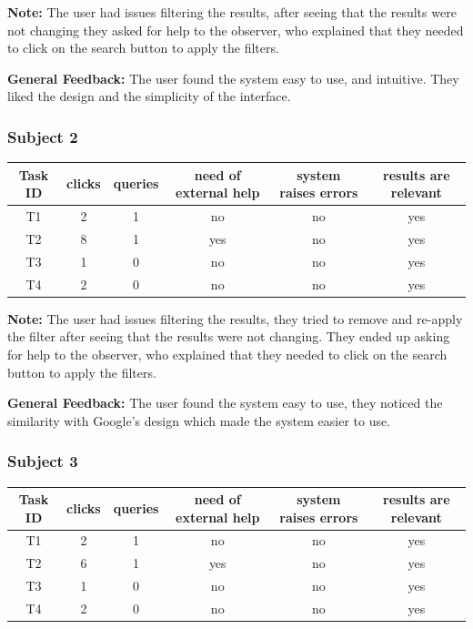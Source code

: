 \documentclass[unicode,9pt,a4paper,oneside,numbers=endperiod,openany]{scrartcl}
\begin{document}
\vspace{0.2cm}

\textbf{Note:} The user had issues filtering the results, after seeing that the results were not changing they asked for help to the observer,
who explained that they needed to click on the search button to apply the filters.

\textbf{General Feedback:} The user found the system easy to use, and intuitive. They liked the design and the simplicity of the interface.

\subsubsection{Subject 2}

\begin{tabular}{c|c|c|c|c|c}
    Task ID & clicks & queries & need of external help & system raises errors & results are relevant \\ \hline
    T1      & 2      & 1       & no                    & no                   & yes                  \\
    T2      & 8      & 1       & yes                   & no                   & yes                  \\
    T3      & 1      & 0       & no                    & no                   & yes                  \\
    T4      & 2      & 0       & no                    & no                   & yes                  \\
\end{tabular}

\vspace{0.2cm}
\textbf{Note:} The user had issues filtering the results, they tried to remove and re-apply the filter after seeing that the results were not changing.
They ended up asking for help to the observer, who explained that they needed to click on the search button to apply the filters.

\textbf{General Feedback:} The user found the system easy to use, they noticed the similarity with Google's design which made the system easier to use.

\subsubsection{Subject 3}

\begin{tabular}{c|c|c|c|c|c}
    Task ID & clicks & queries & need of external help & system raises errors & results are relevant \\ \hline
    T1      & 2      & 1       & no                    & no                   & yes                  \\
    T2      & 6      & 1       & yes                   & no                   & yes                  \\
    T3      & 1      & 0       & no                    & no                   & yes                  \\
    T4      & 2      & 0       & no                    & no                   & yes                  \\
\end{tabular}
\end{document}
